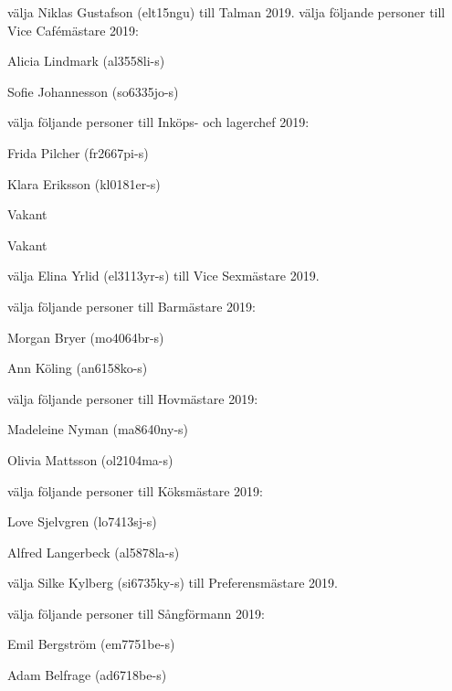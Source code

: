 \documentclass[10pt]{article}
\begin{document}
\begin{paragrafer}
\begin{paralist}
    \newpage

    \Mba välja Niklas Gustafson (elt15ngu) till Talman 2019.
    \Mba välja följande personer till Vice Cafémästare 2019:
    \begin{tightdashlist}
        \item Alicia Lindmark (al3558li-s)
        \item Sofie Johannesson (so6335jo-s)
    \end{tightdashlist}

    \Mba välja följande personer till Inköps- och lagerchef 2019:
    \begin{tightdashlist}
        \item Frida Pilcher (fr2667pi-s)
        \item Klara Eriksson (kl0181er-s)
        \item Vakant
        \item Vakant
    \end{tightdashlist}

    \Mba välja Elina Yrlid (el3113yr-s) till Vice Sexmästare 2019.

    \Mba välja följande personer till Barmästare 2019:
    \begin{tightdashlist}
        \item Morgan Bryer (mo4064br-s)
        \item Ann Köling (an6158ko-s)
    \end{tightdashlist}

    \Mba välja följande personer till Hovmästare 2019:
    \begin{tightdashlist}
        \item Madeleine Nyman (ma8640ny-s)
        \item Olivia Mattsson (ol2104ma-s)
    \end{tightdashlist}

    \Mba välja följande personer till Köksmästare 2019:
    \begin{tightdashlist}
        \item Love Sjelvgren (lo7413sj-s)
        \item Alfred Langerbeck (al5878la-s)
    \end{tightdashlist}

    \Mba välja Silke Kylberg (si6735ky-s) till Preferensmästare 2019.

    \Mba välja följande personer till Sångförmann 2019:
    \begin{tightdashlist}
        \item Emil Bergström (em7751be-s)
        \item Adam Belfrage (ad6718be-s)
    \end{tightdashlist}


\end{paralist}
\end{paragrafer}
\end{document}
